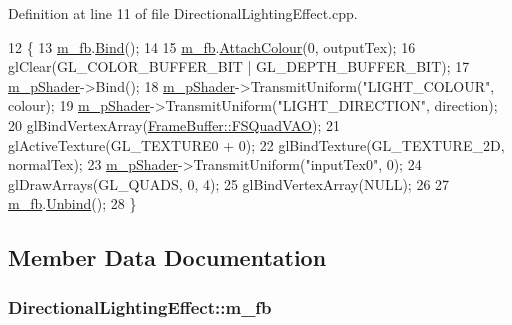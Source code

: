 Definition at line 11 of file Directional\+Lighting\+Effect.\+cpp.


\begin{DoxyCode}
12 \{
13   \hyperlink{class_directional_lighting_effect_a7e94bd539e7cb254d32bdffa4d8aae57}{m\_fb}.\hyperlink{class_frame_buffer_ae7e61568475fba3b15e446c9061833ea}{Bind}();
14 
15   \hyperlink{class_directional_lighting_effect_a7e94bd539e7cb254d32bdffa4d8aae57}{m\_fb}.\hyperlink{class_frame_buffer_a1556417c0dec00d1d24bdf0e84bc4c4d}{AttachColour}(0, outputTex);
16   glClear(GL\_COLOR\_BUFFER\_BIT | GL\_DEPTH\_BUFFER\_BIT);
17   \hyperlink{class_directional_lighting_effect_ad53c001d1de64b1b539b68d5de943c4f}{m\_pShader}->Bind();
18   \hyperlink{class_directional_lighting_effect_ad53c001d1de64b1b539b68d5de943c4f}{m\_pShader}->TransmitUniform(\textcolor{stringliteral}{"LIGHT\_COLOUR"}, colour);
19   \hyperlink{class_directional_lighting_effect_ad53c001d1de64b1b539b68d5de943c4f}{m\_pShader}->TransmitUniform(\textcolor{stringliteral}{"LIGHT\_DIRECTION"}, direction);
20   glBindVertexArray(\hyperlink{class_frame_buffer_a22b0c9de2bef06e0de865684556a6677}{FrameBuffer::FSQuadVAO});
21   glActiveTexture(GL\_TEXTURE0 + 0);
22   glBindTexture(GL\_TEXTURE\_2D, normalTex);
23   \hyperlink{class_directional_lighting_effect_ad53c001d1de64b1b539b68d5de943c4f}{m\_pShader}->TransmitUniform(\textcolor{stringliteral}{"inputTex0"}, 0);
24   glDrawArrays(GL\_QUADS, 0, 4);
25   glBindVertexArray(NULL);
26 
27   \hyperlink{class_directional_lighting_effect_a7e94bd539e7cb254d32bdffa4d8aae57}{m\_fb}.\hyperlink{class_frame_buffer_a1e114b325998ec4e4b9a9ea090d64ae8}{Unbind}();
28 \}
\end{DoxyCode}


\subsection{Member Data Documentation}
\subsubsection[{\texorpdfstring{m\+\_\+fb}{m_fb}}]{ Directional\+Lighting\+Effect\+::m\+\_\+fb\hspace{0.3cm}{\ttfamily [private]}}\hypertarget{class_directional_lighting_effect_a7e94bd539e7cb254d32bdffa4d8aae57}{}\label{class_directional_lighting_effect_a7e94bd539e7cb254d32bdffa4d8aae57}


